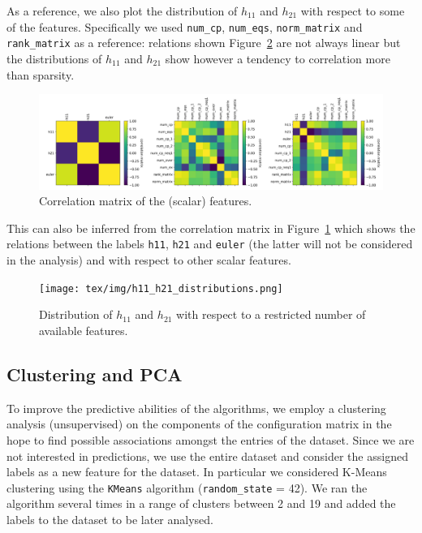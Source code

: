     As a reference, we also plot the distribution of $h_{11}$ and $h_{21}$ with respect to some of the features. Specifically we used \texttt{num\_cp}, \texttt{num\_eqs}, \texttt{norm\_matrix} and \texttt{rank\_matrix} as a reference: relations shown Figure~\ref{fig:scatter_plot_distributions} are not always linear but the distributions of $h_{11}$ and $h_{21}$ show however a tendency to correlation more than sparsity.
    
    \begin{figure}[!t]
        \centering
        \includegraphics[width=\textwidth]{tex/img/correlation_matrix.png}
        \caption{Correlation matrix of the (scalar) features.}
        \label{fig:correlation_matrix}
    \end{figure}
    
    This can also be inferred from the correlation matrix in Figure~\ref{fig:correlation_matrix} which shows the relations between the labels \texttt{h11}, \texttt{h21} and \texttt{euler} (the latter will not be considered in the analysis) and with respect to other scalar features.
    
    \begin{figure}[p]
        \centering
        \texttt{[image: tex/img/h11\_h21\_distributions.png]}
        \caption{Distribution of $h_{11}$ and $h_{21}$ with respect to a restricted number of available features.}
        \label{fig:scatter_plot_distributions}
    \end{figure}
    
\subsection{Clustering and PCA}

    To improve the predictive abilities of the algorithms, we employ a clustering analysis (unsupervised) on the components of the configuration matrix in the hope to find possible associations amongst the entries of the dataset. Since we are not interested in predictions, we use the entire dataset and consider the assigned labels as a new feature for the dataset. In particular we considered K-Means clustering using the \texttt{KMeans} algorithm (\texttt{random\_state} = 42). We ran the algorithm several times in a range of clusters between 2 and 19 and added the labels to the dataset to be later analysed.
    
